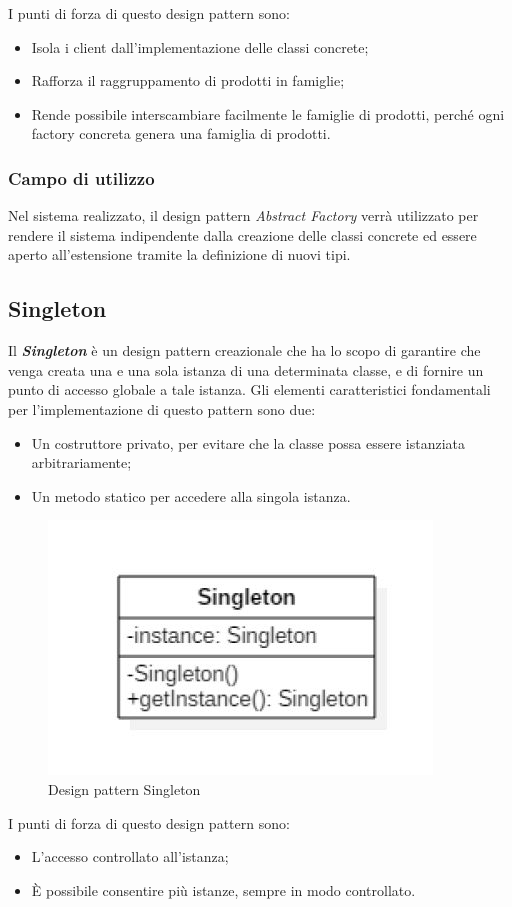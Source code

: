 I punti di forza di questo design pattern sono:
\begin{itemize}
	\item Isola i client dall’implementazione delle classi concrete;
	\item Rafforza il raggruppamento di prodotti in famiglie;
	\item Rende possibile interscambiare facilmente le famiglie di prodotti, perché ogni factory concreta genera una famiglia di prodotti.
\end{itemize}

\subsubsection{Campo di utilizzo}
Nel sistema realizzato, il design pattern \textit{Abstract Factory} verrà utilizzato per rendere il sistema indipendente dalla creazione delle classi concrete ed essere aperto all’estensione tramite la definizione di nuovi tipi.


\subsection{Singleton}
Il \textbf{\textit{Singleton}} è un design pattern creazionale che ha lo scopo di garantire che venga creata una e una sola istanza di una determinata classe, e di fornire un punto di accesso globale a tale istanza.
Gli elementi caratteristici fondamentali per l'implementazione di questo pattern sono due:
\begin{itemize}
	\item Un costruttore privato, per evitare che la classe possa essere istanziata arbitrariamente;
	\item Un metodo statico per accedere alla singola istanza.
\end{itemize}
\begin{figure}[H]
	\centering
	\includegraphics[width=0.4\linewidth]{IMG/singleton_pattern}
	\caption{Design pattern Singleton}
\end{figure}

I punti di forza di questo design pattern sono:
\begin{itemize}
	\item L'accesso controllato all'istanza;
	\item \MakeUppercase{è} possibile consentire più istanze, sempre in modo controllato.
\end{itemize}

